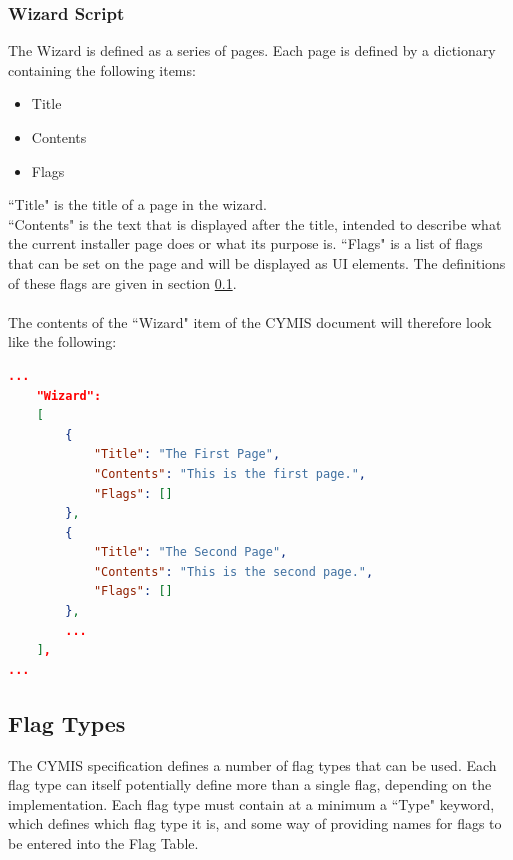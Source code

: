 \documentclass{article}
\begin{document}
\subsubsection{Wizard Script}\label{section:wizardscript}
The Wizard is defined as a series of pages. Each page is defined by a dictionary containing the following items:
\begin{itemize}
\item Title
\item Contents
\item Flags
\end{itemize}
``Title" is the title of a page in the wizard.\\
``Contents" is the text that is displayed after the title, intended to describe what the current installer page does or what its purpose is.
``Flags" is a list of flags that can be set on the page and will be displayed as UI elements. The definitions of these flags are given in section \ref{section:flagtypes}.\\\\
The contents of the ``Wizard" item of the CYMIS document will therefore look like the following:
\begin{lstlisting}[language=json,firstnumber=1]
...
    "Wizard": 
    [
        {
            "Title": "The First Page",
            "Contents": "This is the first page.",
            "Flags": []        
        },
        {
            "Title": "The Second Page",
            "Contents": "This is the second page.",
            "Flags": []
        },
        ...
    ],
...
\end{lstlisting}


\subsection{Flag Types}\label{section:flagtypes}
The CYMIS specification defines a number of flag types that can be used. Each flag type can itself potentially define more than a single flag, depending on the implementation. Each flag type must contain at a minimum a ``Type" keyword, which defines which flag type it is, and some way of providing names for flags to be entered into the Flag Table.
\end{document}

